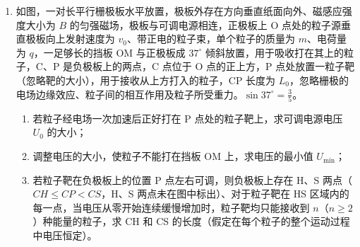 \documentclass[\gkver]{gaokaozhenti}
\begin{document}
\begin{enumerate}
{（2）背包和滑雪者到达水平轨道时的速度为 $v_{1}$、$v_{2}$，有
$v_{1}=a_{1}(t+t_{0})=6\Ums$
$v_{2}=v_{0}+a_{2}t=7.5\Ums$
滑雪者拎起背包的过程，系统在光滑水平面上外力为零，动量守恒，设共同速度为 $v$，有
$m_{1}v_{1}+m_{2}v_{2}=(m_{1}+m_{2})v$
解得
$v=7.44\Ums$
}

\item
如图，一对长平行栅极板水平放置，极板外存在方向垂直纸面向外、磁感应强度大小为 $B$ 的匀强磁场，极板与可调电源相连，正极板上 O 点处的粒子源垂直极板向上发射速度为 $v_{0}$、带正电的粒子束，单个粒子的质量为 $m$、电荷量为 $q$，一足够长的挡板 OM 与正极板成 $37^{\circ}$ 倾斜放置，用于吸收打在其上的粒子，C、P 是负极板上的两点，C 点位于 O 点的正上方，P 点处放置一粒子靶（忽略靶的大小），用于接收从上方打入的粒子，CP 长度为 $L_{0}$，忽略栅极的电场边缘效应、粒子间的相互作用及粒子所受重力。$\sin37^{\circ}=\frac{3}{5}$。
\begin{enumerate}
	\item
	若粒子经电场一次加速后正好打在 P 点处的粒子靶上，求可调电源电压 $U_{0}$ 的大小；
	\item
	调整电压的大小，使粒子不能打在挡板 OM 上，求电压的最小值 $U_{\min}$；
	\item
	若粒子靶在负极板上的位置 P 点左右可调，则负极板上存在 H、S 两点（$CH\leqslant CP<CS$，H、S 两点未在图中标出）、对于粒子靶在 HS 区域内的每一点，当电压从零开始连续缓慢增加时，粒子靶均只能接收到 $n$（$n\geqslant2$）种能量的粒子，求 CH 和 CS 的长度（假定在每个粒子的整个运动过程中电压恒定）。
\end{enumerate}

\end{enumerate}
\end{document}
